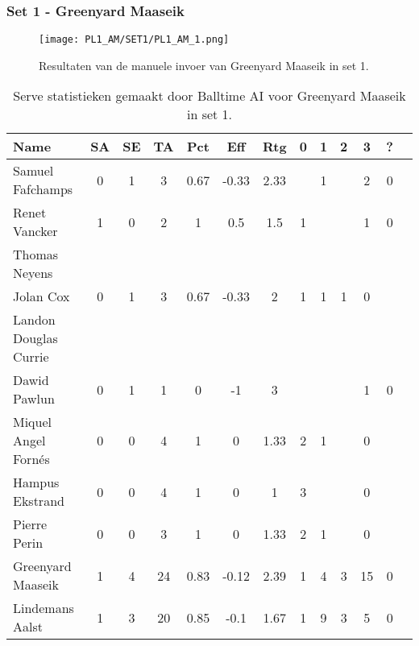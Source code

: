\subsubsection{Set 1 - Greenyard Maaseik}
\label{sec:PL1_Greenyard1}
\begin{figure}
  \centering
  \texttt{[image: PL1\_AM/SET1/PL1\_AM\_1.png]}
  \caption{\label{fig:PL1_AM_1}Resultaten van de manuele invoer van Greenyard Maaseik in set 1.}
\end{figure}

\begin{table}[ht!]
  \centering
  \scriptsize
  \begin{tabular}{|l|c|c|c|c|c|c|c|c|c|c|c|c|} \hline
    \textbf{Name} & SA & SE & TA & Pct & Eff & Rtg & 0 & 1 & 2 & 3 & ? \\ \hline
    Samuel Fafchamps & 0 & 1 & 3 & 0.67 & -0.33 & 2.33 &  & 1 &  & 2 & 0 \\
    Renet Vancker & 1 & 0 & 2 & 1 & 0.5 & 1.5 & 1 &  &  & 1 & 0 \\
    Thomas Neyens &  &  &  &  &  &  &  &  &  &  &  \\
    Jolan Cox & 0 & 1 & 3 & 0.67 & -0.33 & 2 & 1 & 1 & 1 & 0 &  \\
    Landon Douglas Currie &  &  &  &  &  &  &  &  &  &  &  \\
    Dawid Pawlun & 0 & 1 & 1 & 0 & -1 & 3 &  &  &  & 1 & 0 \\
    Miquel Angel Fornés & 0 & 0 & 4 & 1 & 0 & 1.33 & 2 & 1 &  & 0 &  \\
    Hampus Ekstrand & 0 & 0 & 4 & 1 & 0 & 1 & 3 &  &  & 0 &  \\
    Pierre Perin & 0 & 0 & 3 & 1 & 0 & 1.33 & 2 & 1 &  & 0 &  \\
    Greenyard Maaseik & 1 & 4 & 24 & 0.83 & -0.12 & 2.39 & 1 & 4 & 3 & 15 & 0 \\
    Lindemans Aalst & 1 & 3 & 20 & 0.85 & -0.1 & 1.67 & 1 & 9 & 3 & 5 & 0 \\ \hline
  \end{tabular}
  \caption[Serve statistieken gemaakt door Balltime AI voor Greenyard Maaseik in set 1]{\label{tab:PL1ServeMaaseik1}Serve statistieken gemaakt door Balltime AI voor Greenyard Maaseik in set 1.}
\end{table}

